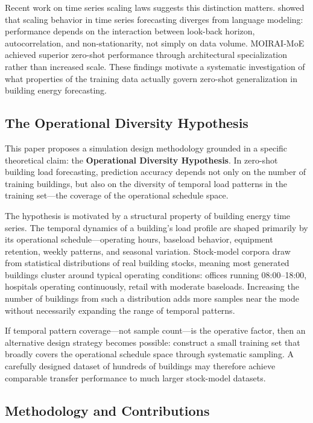\documentclass[preprint,12pt,authoryear]{elsarticle}
\begin{document}
Recent work on time series scaling laws suggests this distinction matters. \citet{Shi2024} showed that scaling behavior in time series forecasting diverges from language modeling: performance depends on the interaction between look-back horizon, autocorrelation, and non-stationarity, not simply on data volume. MOIRAI-MoE \citep{Liu2025} achieved superior zero-shot performance through architectural specialization rather than increased scale. These findings motivate a systematic investigation of what properties of the training data actually govern zero-shot generalization in building energy forecasting.

\subsection{The Operational Diversity Hypothesis}

This paper proposes a simulation design methodology grounded in a specific theoretical claim: the \textbf{Operational Diversity Hypothesis}. In zero-shot building load forecasting, prediction accuracy depends not only on the number of training buildings, but also on the diversity of temporal load patterns in the training set---the coverage of the operational schedule space.

The hypothesis is motivated by a structural property of building energy time series. The temporal dynamics of a building's load profile are shaped primarily by its operational schedule---operating hours, baseload behavior, equipment retention, weekly patterns, and seasonal variation. Stock-model corpora draw from statistical distributions of real building stocks, meaning most generated buildings cluster around typical operating conditions: offices running 08:00--18:00, hospitals operating continuously, retail with moderate baseloads. Increasing the number of buildings from such a distribution adds more samples near the mode without necessarily expanding the range of temporal patterns.

If temporal pattern coverage---not sample count---is the operative factor, then an alternative design strategy becomes possible: construct a small training set that broadly covers the operational schedule space through systematic sampling. A carefully designed dataset of hundreds of buildings may therefore achieve comparable transfer performance to much larger stock-model datasets.

\subsection{Methodology and Contributions}
\end{document}
